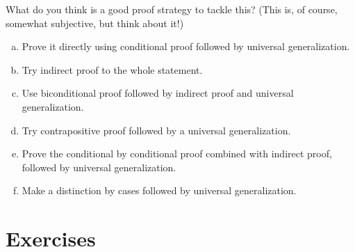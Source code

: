 \begin{enumerate}[{\thesection}.1]
			What do you think is a good proof strategy to tackle this? (This is, of course, somewhat subjective, but think about it!)
	
			\begin{enumerate}[(a)]

				\item Prove it directly using conditional proof followed by universal generalization.
				
				\item Try indirect proof to the whole statement.
				
				\item Use biconditional proof followed by indirect proof and universal generalization.
				
				\item Try contrapositive proof followed by a universal generalization.
				
				\item Prove the conditional by conditional proof combined with indirect proof, followed by universal generalization.
				
				
				\item Make a distinction by cases followed by universal generalization.

			\end{enumerate}
		
			

\end{enumerate}


	
\section{Exercises}


